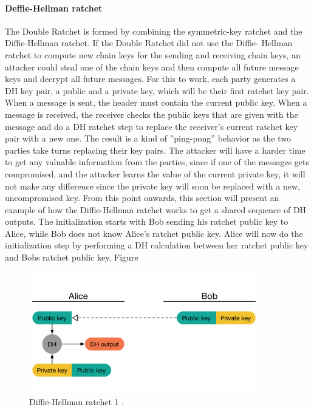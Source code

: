 \paragraph{Deffie-Hellman ratchet}
The Double Ratchet is formed by combining the symmetric-key ratchet and
the Diffie-Hellman ratchet. If the Double Ratchet did not use the Diffie-
Hellman ratchet to compute new chain keys for the sending and receiving
chain keys, an attacker could steal one of the chain keys and then compute
all future message keys and decrypt all future messages.
For this to work, each party generates a DH key pair, a public and a
private key, which will be their first ratchet key pair. When a message
is sent, the header must contain the current public key. When a message
is received, the receiver checks the public keys that are given with the
message and do a DH ratchet step to replace the receiver’s current ratchet
key pair with a new one.
The result is a kind of ”ping-pong” behavior as the two parties take
turns replacing their key pairs. The attacker will have a harder time to get
any valuable information from the parties, since if one of the messages gets
compromised, and the attacker learns the value of the current private key,
it will not make any difference since the private key will soon be replaced
with a new, uncompromised key.
From this point onwards, this section will present an example of how
the Diffie-Hellman ratchet works to get a shared sequence of DH outputs.
The initialization starts with Bob sending his ratchet public key to Alice,
while Bob does not know Alice’s ratchet public key. Alice will now do
the initialization step by performing a DH calculation between her ratchet
public key and Bobs ratchet public key.
Figure

\begin{figure}[H]
	\centering
	\includegraphics[width=10cm]{figures/dhratchet1.png}
	\caption{Diffie-Hellman ratchet 1 \cite{doubleratchet}.}
	\label{fig:dhratchet1}
\end{figure}

